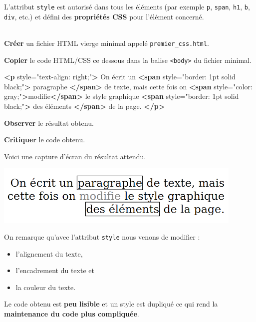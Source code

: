 \documentclass[a4paper,17pt]{extarticle}
\newenvironment{eleve}%
{\begin{activite}\color{noiramu}\\}
{\end{activite}}
\providecommand{\tightlist}{%
      \setlength{\itemsep}{0pt}\setlength{\parskip}{0pt}}
\newenvironment{Shaded}{}{}
\newcommand{\KeywordTok}[1]{\textcolor[rgb]{0.00,0.44,0.13}{\textbf{{#1}}}}
\newcommand{\StringTok}[1]{\textcolor[rgb]{0.25,0.44,0.63}{{#1}}}
\newcommand{\OtherTok}[1]{\textcolor[rgb]{0.00,0.44,0.13}{{#1}}}
\newcommand{\NormalTok}[1]{{#1}}
\begin{document}
    L'attribut \texttt{style} est autorisé dans tous les éléments (par
exemple \texttt{p}, \texttt{span}, \texttt{h1}, \texttt{b},
\texttt{div}, etc.) et défini des \textbf{propriétés CSS} pour l'élément
concerné.
\begin{eleve}
    \textbf{Créer} un fichier HTML vierge minimal appelé
\texttt{premier\_css.html}.

\textbf{Copier} le code HTML/CSS ce dessous dans la balise
\texttt{\textless{}body\textgreater{}} du fichier minimal.

\begin{Shaded}
\begin{Highlighting}[]
\KeywordTok{\textless{}p}\OtherTok{ style=}\StringTok{"text{-}align: right;"}\KeywordTok{\textgreater{}}
\NormalTok{    On écrit un}
    \KeywordTok{\textless{}span}\OtherTok{ style=}\StringTok{"border: 1pt solid black;"}\KeywordTok{\textgreater{}}
\NormalTok{        paragraphe}
    \KeywordTok{\textless{}/span\textgreater{}}
\NormalTok{    de texte, mais cette fois on }
    \KeywordTok{\textless{}span}\OtherTok{ style=}\StringTok{"color: gray;"}\KeywordTok{\textgreater{}}\NormalTok{modifie}\KeywordTok{\textless{}/span\textgreater{}}
\NormalTok{    le style graphique}
    \KeywordTok{\textless{}span}\OtherTok{ style=}\StringTok{"border: 1pt solid black;"}\KeywordTok{\textgreater{}}
\NormalTok{        des éléments}
    \KeywordTok{\textless{}/span\textgreater{}}
\NormalTok{    de la page.}
\KeywordTok{\textless{}/p\textgreater{}}
\end{Highlighting}
\end{Shaded}

\textbf{Observer} le résultat obtenu.

\textbf{Critiquer} le code obtenu.
        
        \end{eleve}\begin{reponse}
    Voici une capture d'écran du résultat attendu.

\includegraphics{res/premier_css.png}

On remarque qu'avec l'attribut \texttt{style} nous venons de modifier :

\begin{itemize}
\tightlist
\item
  l'alignement du texte,
\item
  l'encadrement du texte et
\item
  la couleur du texte.
\end{itemize}

Le code obtenu est \textbf{peu lisible} et un style est dupliqué ce qui
rend la \textbf{maintenance du code plus compliquée}.

            \end{reponse}
\end{document}
